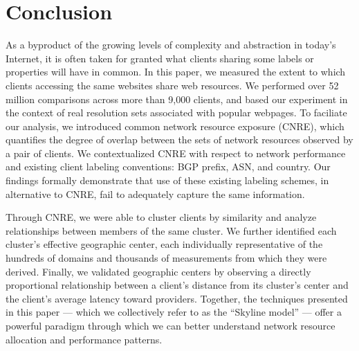 \section{Conclusion}

As a byproduct of the growing levels of complexity and abstraction in today's
Internet, it is often taken for granted what clients sharing some labels or
properties will have in common. In this paper, we measured the extent to which
clients accessing the same websites share web resources. We performed over 52
million comparisons across more than 9,000 clients, and based our experiment in
the context of real resolution sets associated with popular webpages. To
faciliate our analysis, we introduced common network resource exposure (CNRE),
which quantifies the degree of overlap between the sets of network resources
observed by a pair of clients. We contextualized CNRE with respect to network
performance and existing client labeling conventions: BGP prefix, ASN, and
country. Our findings formally demonstrate that use of these existing labeling
schemes, in alternative to CNRE, fail to adequately capture the same
information.

Through CNRE, we were able to cluster clients by similarity and analyze 
relationships between members of the same cluster. We further identified each
cluster's
effective geographic center, each individually representative of the hundreds
of domains and thousands of measurements from which they were derived. Finally,
we validated geographic centers by observing a directly proportional
relationship between a client's distance from its cluster's center and the
client's average latency toward providers. Together,
the techniques presented in this paper --- which we collectively refer to as the
``Skyline model'' --- offer a powerful paradigm through which we can better
understand network resource allocation and performance patterns. 
